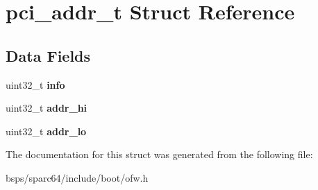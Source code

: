 \hypertarget{structpci__addr__t}{}\section{pci\+\_\+addr\+\_\+t Struct Reference}
\label{structpci__addr__t}
\subsection*{Data Fields}
\begin{DoxyCompactItemize}
\item 
\mbox{\label{structpci__addr__t_a0f7adab6bacc3299cbb86586039f949d}} 
uint32\+\_\+t {\bfseries info}
\item 
\mbox{\label{structpci__addr__t_a4bcec21f9fe686fdddee41f3fa46f803}} 
uint32\+\_\+t {\bfseries addr\+\_\+hi}
\item 
\mbox{\label{structpci__addr__t_a465f9a6e5de1bfb661b87d8641dbdfc9}} 
uint32\+\_\+t {\bfseries addr\+\_\+lo}
\end{DoxyCompactItemize}


The documentation for this struct was generated from the following file\+:\begin{DoxyCompactItemize}
\item 
bsps/sparc64/include/boot/ofw.\+h\end{DoxyCompactItemize}
